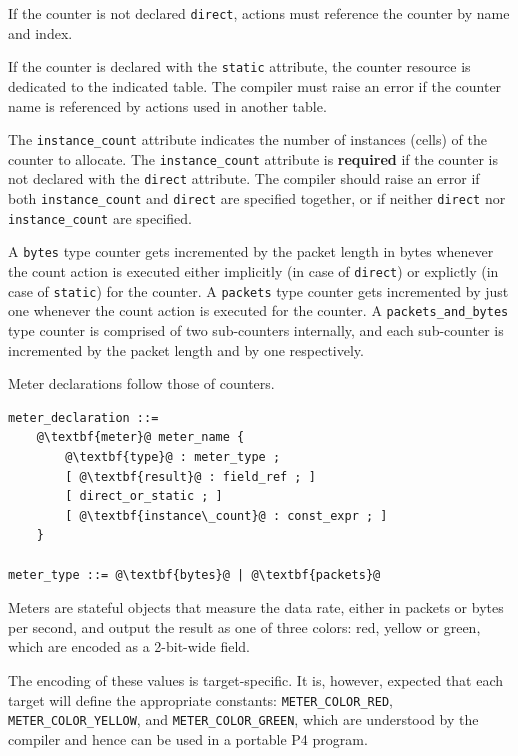 \documentclass[12pt]{article}
\begin{document}
If the counter is not declared \texttt{direct}, actions must reference
the counter by name and index.

If the counter is declared with the \texttt{static} attribute, the
counter resource is dedicated to the indicated table. The compiler
must raise an error if the counter name is referenced by actions used
in another table.

The \texttt{instance_count} attribute indicates the number of
instances (cells) of the counter to allocate. The
\texttt{instance_count} attribute is \textbf{required} if the counter
is not declared with the \texttt{direct} attribute.  The compiler
should raise an error if both \texttt{instance_count} and
\texttt{direct} are specified together, or if neither \texttt{direct}
nor \texttt{instance_count} are specified.  

A \texttt{bytes} type counter gets incremented by the packet length in bytes 
whenever the count action is executed either implicitly (in case of 
\texttt{direct}) or explictly (in case of \texttt{static}) for the counter. 
A \texttt{packets} type counter gets incremented by just one whenever 
the count action is executed for the counter. 
A \texttt{packets_and_bytes} type counter is comprised of two sub-counters 
internally, and each sub-counter is incremented by the packet length and 
by one respectively.



Meter declarations follow those of counters.

\begin{lstlisting}[frame=single,backgroundcolor=\color{bnfgreen},escapechar=\@]
meter_declaration ::= 
    @\textbf{meter}@ meter_name {
        @\textbf{type}@ : meter_type ;
        [ @\textbf{result}@ : field_ref ; ]
        [ direct_or_static ; ]
        [ @\textbf{instance\_count}@ : const_expr ; ]
    }

meter_type ::= @\textbf{bytes}@ | @\textbf{packets}@
\end{lstlisting}

Meters are stateful objects that measure the data rate, either in 
packets or bytes per second, and output the result as one of three 
colors: red, yellow or green, which are encoded as a 2-bit-wide field.

The encoding of these values is target-specific. It is, however, 
expected that each target will define the appropriate constants: 
\texttt{METER_COLOR_RED}, \texttt{METER_COLOR_YELLOW},
and \texttt{METER_COLOR_GREEN}, which are understood by the compiler
and hence can be used in a portable P4 program.
\end{document}
